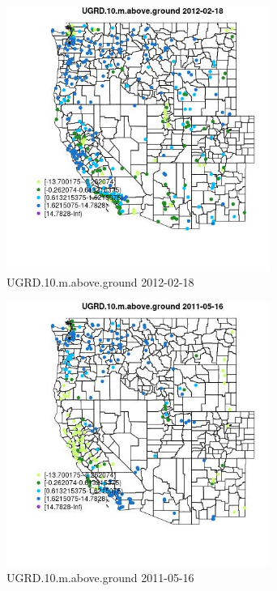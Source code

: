 \begin{figure} 
\centering  
\includegraphics[width=0.77\textwidth]{Code_Outputs/Report_ML_input_PM25_Step4_part_f_de_duplicated_aves_prioritize_24hr_obswNAs_MapObsUGRD10maboveground2012-02-18.jpg} 
\caption{\label{fig:Report_ML_input_PM25_Step4_part_f_de_duplicated_aves_prioritize_24hr_obswNAsMapObsUGRD10maboveground2012-02-18}UGRD.10.m.above.ground 2012-02-18} 
\end{figure} 
 

\begin{figure} 
\centering  
\includegraphics[width=0.77\textwidth]{Code_Outputs/Report_ML_input_PM25_Step4_part_f_de_duplicated_aves_prioritize_24hr_obswNAs_MapObsUGRD10maboveground2011-05-16.jpg} 
\caption{\label{fig:Report_ML_input_PM25_Step4_part_f_de_duplicated_aves_prioritize_24hr_obswNAsMapObsUGRD10maboveground2011-05-16}UGRD.10.m.above.ground 2011-05-16} 
\end{figure} 
 

